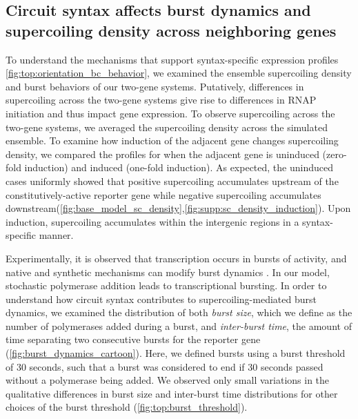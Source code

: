 \documentclass[11pt]{article}
\begin{document}
\FloatBarrier
\subsection{Circuit syntax affects burst dynamics and supercoiling density across neighboring genes}

To understand the mechanisms that support syntax-specific expression profiles \cref{fig:top:orientation_bc_behavior}, we examined the ensemble supercoiling density and burst behaviors of our two-gene systems. Putatively, differences in supercoiling across the two-gene systems give rise to differences in RNAP initiation and thus impact gene expression. To observe supercoiling across the two-gene systems, we averaged the supercoiling density across the simulated ensemble. To examine how induction of the adjacent gene changes supercoiling density, we compared the profiles for when the adjacent gene is uninduced (zero-fold induction) and induced (one-fold induction). As expected, the uninduced cases uniformly showed that positive supercoiling accumulates upstream of the constitutively-active reporter gene while negative supercoiling accumulates downstream(\cref{fig:base_model_sc_density},\cref{fig:supp:sc_density_induction}). Upon induction, supercoiling accumulates within the intergenic regions in a syntax-specific manner. %

Experimentally, it is observed that transcription occurs in bursts of activity, and native and synthetic mechanisms can modify burst dynamics \parencite{desaiDNArepairPathwayCan2021,chongMechanismTranscriptionalBursting2014,poppAlteringTranscriptionFactor2021}.
In our model, stochastic polymerase addition leads to transcriptional bursting. In order to understand how circuit syntax contributes to supercoiling-mediated burst dynamics, we examined the distribution of both \emph{burst size}, which we define as the number of polymerases added during a burst, and \emph{inter-burst time}, the amount of time separating two consecutive bursts for the reporter gene (\cref{fig:burst_dynamics_cartoon}). Here, we defined bursts using a burst threshold of 30 seconds, such that a burst was considered to end if 30 seconds passed without a polymerase being added. We observed only small variations in the qualitative differences in burst size and inter-burst time distributions for other choices of the burst threshold (\cref{fig:top:burst_threshold}).
\end{document}
